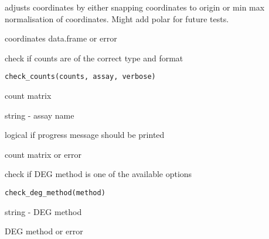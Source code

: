\documentclass[a4paper]{book}
\begin{document}
%
\begin{Details}
adjusts coordinates by either snapping coordinates to origin 
or min max normalisation of coordinates. Might add polar for future tests.
\end{Details}
%
\begin{Value}
coordinates data.frame or error
\end{Value}
%
\begin{Description}
check if counts are of the correct type and format
\end{Description}
%
\begin{Usage}
\begin{verbatim}
check_counts(counts, assay, verbose)
\end{verbatim}
\end{Usage}
%
\begin{Arguments}
\begin{ldescription}
\item[\code{counts}] count matrix

\item[\code{assay}] string - assay name

\item[\code{verbose}] logical if progress message should be printed
\end{ldescription}
\end{Arguments}
%
\begin{Value}
count matrix or error
\end{Value}
%
\begin{Description}
check if DEG method is one of the available options
\end{Description}
%
\begin{Usage}
\begin{verbatim}
check_deg_method(method)
\end{verbatim}
\end{Usage}
%
\begin{Arguments}
\begin{ldescription}
\item[\code{method}] string - DEG method
\end{ldescription}
\end{Arguments}
%
\begin{Value}
DEG method or error
\end{Value}
\end{document}
